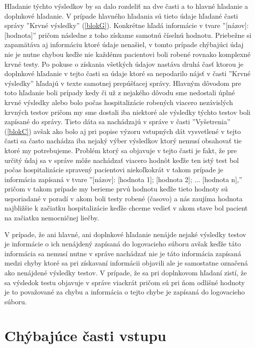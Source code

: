 Hľadanie týchto výsledkov by sa dalo rozdeliť na dve časti a to hlavné hľadanie a doplnkové hľadanie. V prípade hlavného hľadania sú tieto údaje hľadané časti správy ''Krvné výsledky'' (\ref{blokG}). Konkrétne hľadá informácie v tvare ''[názov]: [hodnota]'' pričom následne z toho získame samotnú číselnú hodnotu. Priebežne si zapamätáva aj informáciu ktoré údaje nenašiel, v tomto prípade chýbajúci údaj nie je nutne chybou keďže nie každému pacientovi boli robené rovnako komplexné krvné testy. Po pokuse o získania všetkých údajov nastáva druhá časť ktorou je doplnkové hľadanie v tejto časti sa údaje ktoré sa nepodarilo nájsť v časti ''Krvné výsledky'' hľadajú v texte samotnej prepúšťacej správy. Hlavným dôvodom pre toto hľadanie boli prípady kedy či už z nejakého dôvodu sme nedostali úplné krvné výsledky alebo bolo počas hospitalizácie robených viacero nezávislých krvných testov pričom my sme dostali iba niektoré ale výsledky týchto testov boli zapísané do správy. Tieto dáta sa nachádzajú v správe v časti ''Vyšetrenia'' (\ref{blokC}) avšak ako bolo aj pri popise výzoru vstupných dát vysvetlené v tejto časti sa často nachádza iba nejaký výber výsledkov ktorý nemusí obsahovať tie ktoré my potrebujeme. Problém ktorý sa objavuje v tejto časti je fakt, že pre určitý údaj sa v správe môže nachádzať viacero hodnôt keďže ten istý test bol počas hospitalizácie spravený pacientovi niekoľkokrát v takom prípade je informácia zapísaná v tvare ''[názov]: [hodnota 1]; [hodnota 2]; ... [hodnota n],'' pričom v takom prípade my berieme prvú hodnotu keďže tieto hodnoty sú usporiadané v poradí v akom boli testy robené (časovo) a nás zaujíma hodnota najbližšie k začiatku hospitalizácie keďže chceme vedieť v akom stave bol pacient na začiatku nemocničnej liečby.

V prípade, že ani hlavné, ani doplnkové hľadanie nenájde nejaké výsledky testov je informácie o ich nenájdený zapísaná do logovacieho súboru avšak keďže táto informácia sa nemusí nutne v správe nachádzať nie je táto informácia zapísaná medzi chyby ktoré sa pri získavaní informácii objavili ale je samostatne označená ako nenájdené výsledky testov. V prípade, že sa pri doplnkovom hľadaní zistí, že sa výsledok testu objavuje v správe viackrát pričom sú pri ňom odlišné hodnoty je to považované za chybu a informácia o tejto chybe je zapísaná do logovacieho súboru.

\section{Chýbajúce časti vstupu}

